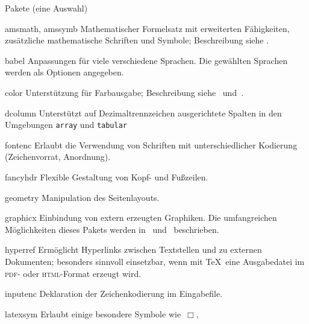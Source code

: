 \begin{table}[htbp]
\caption{Pakete (eine Auswahl)}\label{pack}
\begin{lminipage}{11cm}
\begin{ttdescription}%
\setlength{\itemsep}{.5\itemsep plus1pt minus1pt}
\item[amsmath, amssymb] Mathematischer Formelsatz mit erweiterten Fähigkeiten,
  zusätzliche mathematische Schriften und Symbole; Beschreibung siehe
  \cite{ch8}.
\item[babel] Anpassungen für viele verschiedene Sprachen. Die
  gewählten Sprachen werden als Optionen angegeben.
\item[color] Unterstützung für Farbausgabe;
  Beschreibung  siehe~\cite{grfguide} und~\cite{grfcomp}.
\item[dcolumn] Unterstützt auf Dezimaltrennzeichen ausgerichtete
  Spalten in den Umgebungen \texttt{array} und \texttt{tabular}
\item[fontenc] Erlaubt die Verwendung von Schriften mit
  unterschiedlicher Kodierung (Zeichenvorrat, Anordnung).
\item[fancyhdr] Flexible Gestaltung von Kopf- und Fußzeilen.
\item[geometry] Manipulation des Seitenlayouts.
\item[graphicx] Einbindung von extern erzeugten Graphiken.
  Die umfangreichen Möglichkeiten dieses Pakets werden 
  in~\cite{grfguide} und~\cite{grfcomp} beschrieben.
\item[hyperref] Ermöglicht Hyperlinks zwischen Textstellen und zu
  externen Dokumenten; besonders sinnvoll einsetzbar, 
  wenn mit \TeX\ eine Ausgabedatei im \textsc{pdf}- oder \textsc{html}-Format 
  erzeugt wird.
\item[inputenc] Deklaration der Zeichenkodierung im
  Eingabefile.
\item[latexsym] Erlaubt einige besondere Symbole wie~\(\Box\),

\end{ttdescription}
\end{lminipage}
\end{table}
